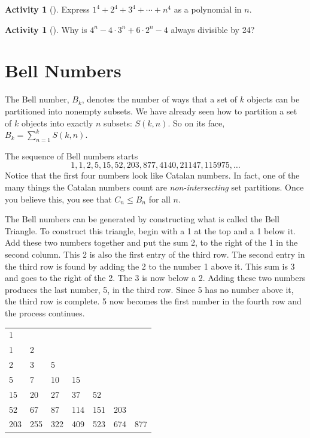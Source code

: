 \documentclass[10pt,]{book}
\theoremstyle{plain}
\theoremstyle{definition}
\theoremstyle{definition}
\theoremstyle{definition}
\newtheorem{activity}[project]{Activity}
\numberwithin{equation}{chapter}
\begin{document}
\begin{activity}[]\label{activity-233}
\hypertarget{p-1056}{}%
Express \(1^4 + 2^4 + 3^4 + \cdots + n^4\) as a polynomial in \(n\).%
\end{activity}
\begin{activity}[]\label{activity-234}
\hypertarget{p-1057}{}%
Why is \(4^n - 4\cdot 3^n + 6\cdot 2^n - 4\) always divisible by 24?%
\end{activity}
\typeout{************************************************}
\typeout{************************************************}
\section[{Bell Numbers}]{Bell Numbers}\label{sec_adv-bell}
\hypertarget{p-1058}{}%
The Bell number, \(B_{k}\), denotes the number of ways that a set of \(k\) objects can be partitioned into nonempty subsets. We have already seen how to partition a set of \(k\) objects into exactly \(n\) subsets: \(S(k,n)\).  So on its face, \(B_k = \sum_{n=1}^kS(k,n)\).%
\par
\hypertarget{p-1059}{}%
The sequence of Bell numbers starts%
\begin{equation*}
1, 1, 2, 5, 15, 52, 203, 877, 4140, 21147, 115975, \ldots
\end{equation*}
Notice that the first four numbers look like Catalan numbers.  In fact, one of the many things the Catalan numbers count are \emph{non-intersecting} set partitions.  Once you believe this, you see that \(C_n \le B_n\) for all \(n\).%
\par
\hypertarget{p-1060}{}%
The Bell numbers can be generated by constructing what is called the Bell Triangle. To construct this triangle, begin with a 1 at the top and a 1 below it. Add these two numbers together and put the sum 2, to the right of the 1 in the second column. This 2 is also the first entry of the third row. The second entry in the third row is found by adding the 2 to the number 1 above it. This sum is 3 and goes to the right of the 2. The 3 is now below a 2. Adding these two numbers produces the last number, 5, in the third row. Since 5 has no number above it, the third row is complete. 5 now becomes the first number in the fourth row and the process continues.%
\begin{sidebyside}{1}{0.15}{0.15}{0}
\begin{sbspanel}{0.7}
{\centering%
\begin{tabular}{lllllll}
1&&&&&&\tabularnewline[0pt]
1&2&&&&&\tabularnewline[0pt]
2&3&5&&&&\tabularnewline[0pt]
5&7&10&15&&&\tabularnewline[0pt]
15&20&27&37&52&&\tabularnewline[0pt]
52&67&87&114&151&203&\tabularnewline[0pt]
203&255&322&409&523&674&877
\end{tabular}
\par}
\end{sbspanel}
\end{sidebyside}
\end{document}
